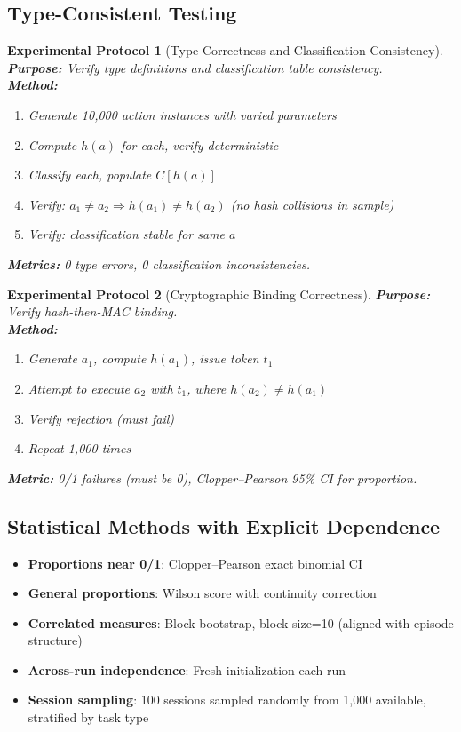 \documentclass[12pt]{article}
\newtheorem{protocol}{Experimental Protocol}[section]
\begin{document}
\subsection{Type-Consistent Testing}

\begin{protocol}[Type-Correctness and Classification Consistency]
\textbf{Purpose:} Verify type definitions and classification table consistency.\\
\textbf{Method:}
\begin{enumerate}
    \item Generate 10,000 action instances with varied parameters
    \item Compute $h(a)$ for each, verify deterministic
    \item Classify each, populate $C[h(a)]$
    \item Verify: $a_1 \neq a_2 \Rightarrow h(a_1) \neq h(a_2)$ (no hash collisions in sample)
    \item Verify: classification stable for same $a$
\end{enumerate}
\textbf{Metrics:} 0 type errors, 0 classification inconsistencies.
\end{protocol}

\begin{protocol}[Cryptographic Binding Correctness]
\textbf{Purpose:} Verify hash-then-MAC binding.\\
\textbf{Method:}
\begin{enumerate}
    \item Generate $a_1$, compute $h(a_1)$, issue token $t_1$
    \item Attempt to execute $a_2$ with $t_1$, where $h(a_2) \neq h(a_1)$
    \item Verify rejection (must fail)
    \item Repeat 1,000 times
\end{enumerate}
\textbf{Metric:} 0/1 failures (must be 0), Clopper--Pearson 95\% CI for proportion.
\end{protocol}

\subsection{Statistical Methods with Explicit Dependence}

\begin{itemize}
    \item \textbf{Proportions near 0/1}: Clopper--Pearson exact binomial CI
    \item \textbf{General proportions}: Wilson score with continuity correction
    \item \textbf{Correlated measures}: Block bootstrap, block size=10 (aligned with episode structure)
    \item \textbf{Across-run independence}: Fresh initialization each run
    \item \textbf{Session sampling}: 100 sessions sampled randomly from 1,000 available, stratified by task type
\end{itemize}
\end{document}
